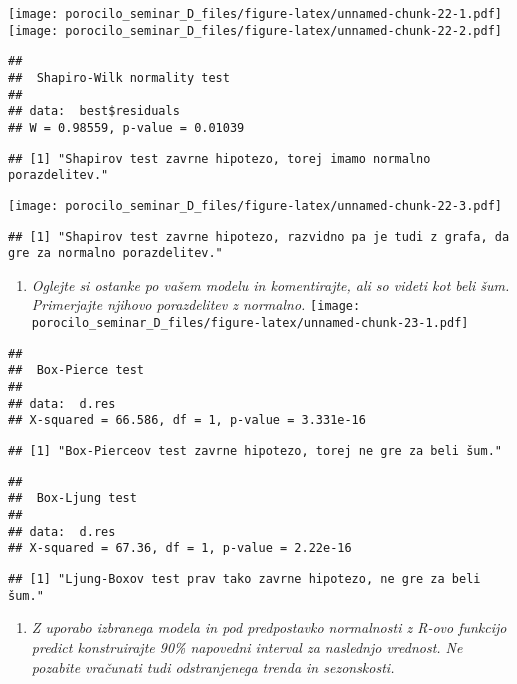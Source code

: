 \documentclass[
]{article}
\providecommand{\tightlist}{%
  \setlength{\itemsep}{0pt}\setlength{\parskip}{0pt}}
\begin{document}
\texttt{[image: porocilo\_seminar\_D\_files/figure-latex/unnamed-chunk-22-1.pdf]}
\texttt{[image: porocilo\_seminar\_D\_files/figure-latex/unnamed-chunk-22-2.pdf]}

\begin{verbatim}
## 
##  Shapiro-Wilk normality test
## 
## data:  best$residuals
## W = 0.98559, p-value = 0.01039
\end{verbatim}

\begin{verbatim}
## [1] "Shapirov test zavrne hipotezo, torej imamo normalno porazdelitev."
\end{verbatim}

\texttt{[image: porocilo\_seminar\_D\_files/figure-latex/unnamed-chunk-22-3.pdf]}

\begin{verbatim}
## [1] "Shapirov test zavrne hipotezo, razvidno pa je tudi z grafa, da gre za normalno porazdelitev."
\end{verbatim}

\begin{enumerate}
\def\labelenumi{\arabic{enumi}.}
\setcounter{enumi}{6}
\tightlist
\item
  \emph{Oglejte si ostanke po vašem modelu in komentirajte, ali so
  videti kot beli šum. Primerjajte njihovo porazdelitev z normalno.}
  \texttt{[image: porocilo\_seminar\_D\_files/figure-latex/unnamed-chunk-23-1.pdf]}
\end{enumerate}

\begin{verbatim}
## 
##  Box-Pierce test
## 
## data:  d.res
## X-squared = 66.586, df = 1, p-value = 3.331e-16
\end{verbatim}

\begin{verbatim}
## [1] "Box-Pierceov test zavrne hipotezo, torej ne gre za beli šum."
\end{verbatim}

\begin{verbatim}
## 
##  Box-Ljung test
## 
## data:  d.res
## X-squared = 67.36, df = 1, p-value = 2.22e-16
\end{verbatim}

\begin{verbatim}
## [1] "Ljung-Boxov test prav tako zavrne hipotezo, ne gre za beli šum."
\end{verbatim}

\begin{enumerate}
\def\labelenumi{\arabic{enumi}.}
\setcounter{enumi}{7}
\tightlist
\item
  \emph{Z uporabo izbranega modela in pod predpostavko normalnosti z
  R-ovo funkcijo predict konstruirajte 90\% napovedni interval za
  naslednjo vrednost. Ne pozabite vračunati tudi odstranjenega trenda in
  sezonskosti.}
\end{enumerate}
\end{document}
